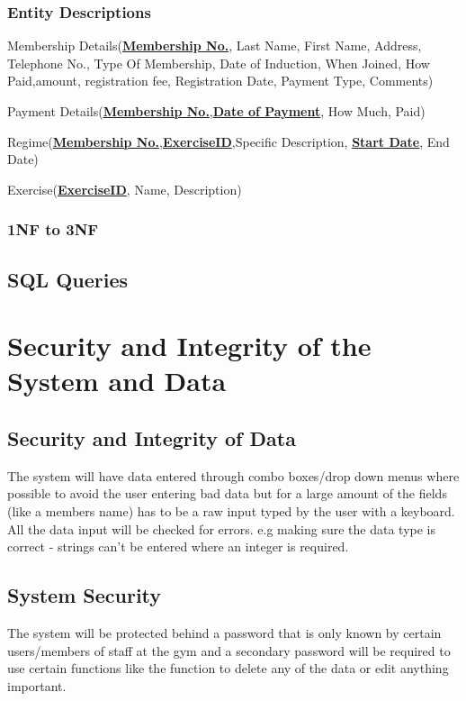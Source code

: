 \begin{itemize}
\subsubsection{Entity Descriptions}

Membership Details(\textbf{\underline{Membership No.}}, Last Name, First Name, Address, Telephone No., Type Of Membership, Date of Induction, When Joined, How Paid,amount, registration fee, Registration Date, Payment Type, Comments)

Payment Details(\textbf{\underline{Membership No.}},\textbf{\underline{Date of Payment}}, How Much, Paid)

Regime(\textbf{\underline{Membership No.}},\textbf{\underline{ExerciseID}},Specific Description, \textbf{\underline{Start Date}}, End Date)

Exercise(\textbf{\underline{ExerciseID}}, Name, Description)


\subsubsection{1NF to 3NF}

\subsection{SQL Queries}

\section{Security and Integrity of the System and Data}

\subsection{Security and Integrity of Data}
The system will have data entered through combo boxes/drop down menus where possible to avoid the user entering bad data but for a large amount of the fields (like a members name) has to be a raw input typed by the user with a keyboard. All the data input will be checked for errors. e.g making sure the data type is correct - strings can't be entered where an integer is required. 

\subsection{System Security}
The system will be protected behind a password that is only known by certain users/members of staff at the gym and a secondary password will be required to use certain functions like the function to delete any of the data or edit anything important.


\end{itemize}
